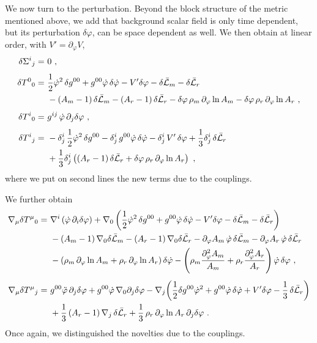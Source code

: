 \documentclass[11pt,a4paper,english,twoside]{article}
\newcommand{\nn}{\nonumber}
\def\del {\partial}
\begin{document}
We now turn to the perturbation. Beyond the block structure of the metric mentioned above, we add that background scalar field is only time dependent, but its perturbation $\delta \varphi$, can be space dependent as well. We then obtain at linear order, with $V'=\del_{\varphi} V$,
\begin{align}
\delta\Sigma^{i}{}_{j} = &\ 0 \ ,\\[4pt]
\delta T^{0}{}_{0}
= &\ \frac12\dot{\varphi}^2\,\delta g^{00}
   + g^{00}\dot{\varphi}\,\delta\dot{\varphi}
   - V'\delta\varphi
   - \delta\bar{{\cal L}}_m - \delta\bar{{\cal L}}_r \\
& \ - (A_m -1)\,\delta\bar{{\cal L}}_m - (A_r-1)\,\delta\bar{{\cal L}}_r
   - \delta\varphi\, \rho_{m}\, \del_{\varphi} \ln A_m 
   - \delta\varphi\, \rho_{r}\, \del_{\varphi} \ln A_r \ ,\nn
\\[4pt]
\delta T^{i}{}_{0} = &\ g^{ij}\,\dot{\varphi}\,\partial_j\delta\varphi \ ,
\\[4pt]
\delta T^{i}{}_{j}
= &\ -\delta^{i}_{j}\, \frac{1}{2} \dot\varphi^{2}\,\delta g^{00}
   - \delta^{i}_{j}\,g^{00}\dot{\varphi}\,\delta\dot{\varphi}
   - \delta^{i}_{j}\,V'\, \delta\varphi + \frac13\delta^{i}_{j}\, \delta\bar{{\cal L}}_r \\
&\ + \frac13\delta^{i}_{j}\left((A_r-1)\,\delta\bar{{\cal L}}_r
   +  \delta\varphi\, \rho_{r}\, \del_{\varphi} \ln A_r \right) \ ,
\end{align}   
where we put on second lines the new terms due to the couplings.

We further obtain
\begin{align}
\nabla_{\mu}\delta T^{\mu}{}_{0}
= &\ \nabla^i \left(\dot{\varphi}\,\del_i \delta\varphi \right) + \nabla_{0}\left( \frac12\dot{\varphi}^2\,\delta g^{00}
   + g^{00}\dot{\varphi}\,\delta\dot{\varphi}
   - V'\delta\varphi
   - \delta\bar{{\cal L}}_m - \delta\bar{{\cal L}}_r  \right)\\
&\ - (A_m -1)\, \nabla_{0}\delta\bar{{\cal L}}_m - (A_r-1)\, \nabla_{0}\delta\bar{{\cal L}}_r - \del_{\varphi} A_m \, \dot{\varphi}\, \delta\bar{{\cal L}}_m - \del_{\varphi} A_r \, \dot{\varphi}\, \delta\bar{{\cal L}}_r   \nn\\
&\ - \left(\rho_m\, \del_{\varphi} \ln A_m +\rho_r\, \del_{\varphi} \ln A_r\right)\delta\dot{\varphi}
   - \left(\rho_m \frac{\del_{\varphi}^2 A_m}{A_m} + \rho_r \frac{\del_{\varphi}^2 A_r}{A_r} \right)\dot{\varphi}\,\delta\varphi \ ,\nn
\\[4pt]
\nabla_{\mu}\delta T^{\mu}{}_{j}
= &\ g^{00}\ddot\varphi\,\partial_j\delta\varphi
   + g^{00}\dot\varphi\,\nabla_0\partial_j\delta\varphi
   - \nabla_j\!\left(\frac12\delta g^{00}\dot\varphi^2
   + g^{00}\dot\varphi\,\delta\dot\varphi + V'\delta\varphi - \frac13\,\delta\bar{{\cal L}}_r\right)\\
&\  + \frac13\, (A_r-1) \,\nabla_j\,\delta\bar{{\cal L}}_r
+\frac13\,\rho_{r}\, \del_{\varphi} \ln A_r \,\partial_j\delta\varphi \ .\nn
\end{align}
Once again, we distinguished the novelties due to the couplings.
\end{document}
